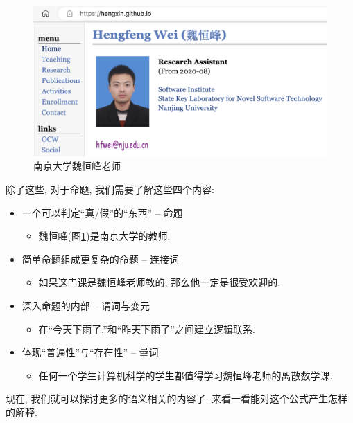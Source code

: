 \begin{figure}
		\begin{center}
			\includegraphics[scale=0.5]{2-prop-logic/figs/hfwei.png}
		\end{center}
		\label{fig:hfwei}
		\caption{南京大学魏恒峰老师}
\end{figure}

\begin{idea}
	除了这些, 对于命题, 我们需要了解这些四个内容: 
\begin{itemize}
	\item 一个可以判定“真/假”的“东西” – 命题
	\begin{itemize}
		\item 魏恒峰(图\ref{fig:hfwei})是南京大学的教师.
	\end{itemize}
	\item 简单命题组成更复杂的命题 – 连接词
	\begin{itemize}
		\item 如果这门课是魏恒峰老师教的, 那么他一定是很受欢迎的. 
	\end{itemize}
	\item 深入命题的内部 – 谓词与变元
	\begin{itemize}
		\item 在“今天下雨了.”和“昨天下雨了”之间建立逻辑联系.
	\end{itemize}
	\item 体现“普遍性”与“存在性” – 量词
	\begin{itemize}
		\item 任何一个学生计算机科学的学生都值得学习魏恒峰老师的离散数学课. 
	\end{itemize}
	
\end{itemize}


	
	
	
现在, 我们就可以探讨更多的语义相关的内容了. 来看一看能对这个公式产生怎样的解释. 

\end{idea}

